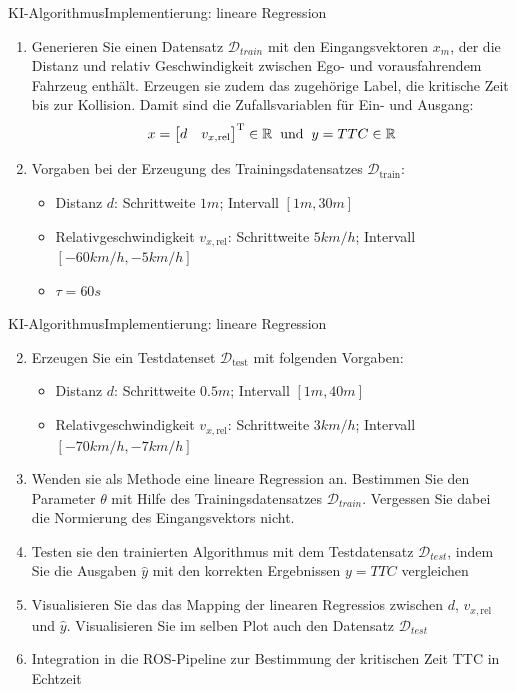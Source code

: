 \documentclass[169, handout	]{THIbeamer} %
\begin{document}
	\begin{frame}{KI-Algorithmus}{Implementierung: lineare Regression}
		\begin{enumerate}
			\item Generieren Sie einen Datensatz $\mathcal{D}_{train}$ mit den Eingangsvektoren $x_m$, der die Distanz und relativ Geschwindigkeit zwischen Ego- und vorausfahrendem Fahrzeug enthält. Erzeugen sie zudem das zugehörige Label, die kritische Zeit bis zur Kollision. Damit sind die Zufallsvariablen für Ein- und Ausgang:
		\begin{equation}
			x = 			
			\begin{bmatrix}
				d & v_{x,\text{rel}}
			\end{bmatrix}
			^{\text{T}} \in \mathbb{R} 
			\hspace{0.2 cm}
			\text{und}
			\hspace{0.2 cm}			
			y = TTC \in \mathbb{R}
		\end{equation}
			\item[] Vorgaben bei der Erzeugung des Trainingsdatensatzes $\mathcal{D}_{\text{train}}$:
			\begin{itemize}
				\item Distanz $d$: Schrittweite $1m$; Intervall $[1m, 30m]$ 
				\item Relativgeschwindigkeit $v_{x,\text{rel}}$: Schrittweite $5 km/h$; Intervall $[-60 km/h, -5 km/h]$
				\item $\tau = 60s$
			\end{itemize}			 
		\end{enumerate}
	\end{frame}
	\begin{frame}{KI-Algorithmus}{Implementierung: lineare Regression}
		\begin{enumerate}
			\setcounter{enumi}{1}
			\item Erzeugen Sie ein Testdatenset $\mathcal{D}_{\text{test}}$ mit folgenden Vorgaben:
			\begin{itemize}
				\item Distanz $d$: Schrittweite $0.5m$; Intervall $[1m, 40m]$ 
				\item Relativgeschwindigkeit $v_{x,\text{rel}}$: Schrittweite $3 km/h$; Intervall $[-70 km/h, -7 km/h]$
			\end{itemize}
			\item Wenden sie als Methode eine lineare Regression an. Bestimmen Sie den Parameter $\theta$ mit Hilfe des Trainingsdatensatzes $\mathcal{D}_{train}$. Vergessen Sie dabei die Normierung des Eingangsvektors nicht.
			\item Testen sie den trainierten Algorithmus mit dem Testdatensatz $\mathcal{D}_{test}$, indem Sie die Ausgaben $\hat{y}$ mit den korrekten Ergebnissen $y = TTC$ vergleichen
			\item Visualisieren Sie das das Mapping der linearen Regressios zwischen $d$, $v_{x,\text{rel}}$ und $\hat{y}$. Visualisieren Sie im selben Plot auch den Datensatz $\mathcal{D}_{test}$
			\item Integration in die ROS-Pipeline zur Bestimmung der kritischen Zeit TTC in Echtzeit
		\end{enumerate}
	\end{frame}
\end{document}
